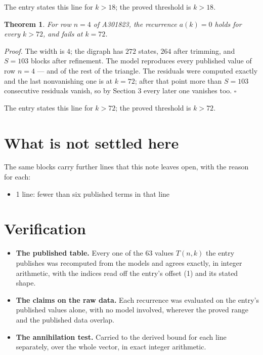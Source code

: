 \documentclass[11pt]{article}
\newtheorem{theorem}{Theorem}
\theoremstyle{definition}
\begin{document}
The entry states this line for $k > 18$; the proved threshold is $k > 18$.

\begin{theorem} For row $n = 4$ of A301823, the recurrence $a(k) = 0$ holds for every $k > 72$, and fails at $k = 72$.\end{theorem}

{\itshape Proof.} The width is $4$; the digraph has $272$ states, $264$ after trimming, and $S = 103$ blocks after refinement. The model reproduces every published value of row $n = 4$ --- and of the rest of the triangle. The residuals were computed exactly and the last nonvanishing one is at $k = 72$; after that point more than $S = 103$ consecutive residuals vanish, so by Section 3 every later one vanishes too. $\square$

The entry states this line for $k > 72$; the proved threshold is $k > 72$.

\section{What is not settled here}

The same blocks carry further lines that this note leaves open, with the reason for each:

\begin{itemize}

\item 1 line: fewer than six published terms in that line

\end{itemize}

\section{Verification}

\begin{itemize}

\item {\bfseries The published table.} Every one of the 63 values $T(n,k)$ the entry publishes was recomputed from the models and agrees exactly, in integer arithmetic, with the indices read off the entry's offset (1) and its stated shape.

\item {\bfseries The claims on the raw data.} Each recurrence was evaluated on the entry's published values alone, with no model involved, wherever the proved range and the published data overlap.

\item {\bfseries The annihilation test.} Carried to the derived bound for each line separately, over the whole vector, in exact integer arithmetic.

\end{itemize}
\end{document}
